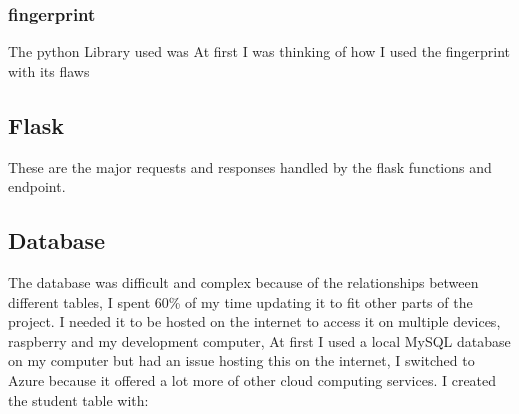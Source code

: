 \subsubsection{fingerprint}
The python Library used was 
At first I was thinking of 
how I used the fingerprint with its flaws

\subsection{Flask}

These are the major requests and responses handled by the flask functions and endpoint.



\subsection{Database}
The database was difficult and complex because of the relationships between different tables, I spent 60\% of my time updating it to fit other parts of the project. I needed it to be hosted on the internet to access it on multiple devices, raspberry and my development computer, At first I used a local MySQL database on my computer but had an issue hosting this on the internet, I switched to Azure because it offered a lot more of other cloud computing services. I created the student table with:
